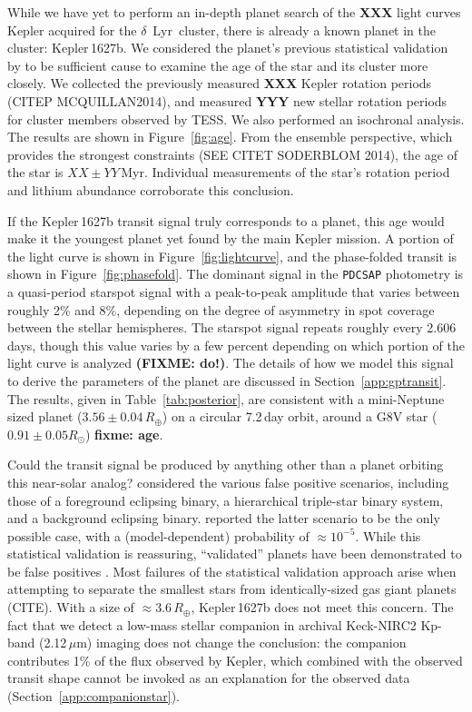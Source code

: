 \documentclass[12pt,modern,tighten]{aastex63}
\newcommand{\cn}{$\delta$~Lyr\ cluster} %
\begin{document}
While we have yet to perform an in-depth planet search of the {\bf
XXX} light curves Kepler acquired for the \cn, there is already a
known planet in the cluster: Kepler\,1627b.  We considered the
planet's previous statistical validation by \citet{morton_false_2016}
to be sufficient cause to examine the age of the star and its cluster more closely.
We collected the previously measured {\bf XXX} Kepler
rotation periods (CITEP MCQUILLAN2014), and measured {\bf YYY} new stellar
rotation periods for cluster members observed by TESS.
We also performed an isochronal analysis.
The results are shown in Figure~\ref{fig:age}.
From the ensemble perspective, which provides the strongest
constraints (SEE CITET SODERBLOM 2014),
the age of the star is $XX \pm YY$\,Myr.
Individual measurements of the star's rotation period and lithium
abundance corroborate this conclusion.

If the Kepler\,1627b transit signal truly corresponds to a planet,
this age would make it the youngest planet yet found by the main
Kepler mission.  A portion of the light curve is shown in
Figure~\ref{fig:lightcurve}, and the phase-folded transit is shown in
Figure~\ref{fig:phasefold}.  The dominant signal in the
\texttt{PDCSAP} photometry is a quasi-period starspot signal with a
peak-to-peak amplitude that varies between roughly 2\% and 8\%,
depending on the degree of asymmetry in spot coverage between the
stellar hemispheres.  The starspot signal repeats roughly every
2.606\,days, though this value varies by a few percent depending on
which portion of the light curve is analyzed {\bf (FIXME: do!)}.  The
details of how we model this signal to derive the parameters of the
planet are discussed in Section~\ref{app:gptransit}.  The results,
given in Table~\ref{tab:posterior}, are consistent with a mini-Neptune
sized planet ($3.56\pm 0.04\,R_\oplus$) on a circular 7.2\,day orbit,
around a G8V star ($0.91 \pm 0.05 R_\odot$) {\bf fixme: age}. 

Could the transit signal be produced by anything other than a planet
orbiting this near-solar analog?  \citet{morton_false_2016} considered
the various false positive scenarios, including those of a foreground
eclipsing binary, a hierarchical triple-star binary system, and a
background eclipsing binary.  \citet{morton_false_2016} reported the
latter scenario to be the only possible case, with a (model-dependent)
probability of $\approx10^{-5}$.  While this statistical validation is
reassuring, ``validated'' planets have been demonstrated to be false
positives \citep{shporer_three_2017}.  Most failures of the
statistical validation approach arise when attempting to separate the
smallest stars from identically-sized gas giant planets (CITE).  With a size
of $\approx 3.6\,R_\oplus$, Kepler\,1627b does not meet this
concern.  The fact that we detect a low-mass stellar companion in
archival Keck-NIRC2 Kp-band (2.12\,$\mu $m) imaging does not change
the conclusion: the companion contributes 1\% of the flux
observed by Kepler, which combined with the observed transit shape
cannot be invoked as an explanation for the observed data
(Section~\ref{app:companionstar}).
\end{document}
